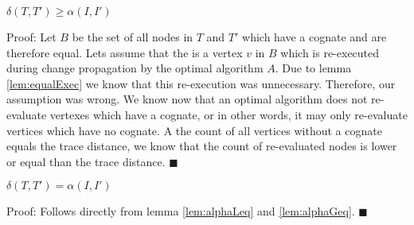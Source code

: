 \begin{lemma}
\label{lem:alphaGeq}
$\delta(T, T') \geq \alpha(I, I')$
\end{lemma} 
Proof: Let $B$ be the set of all nodes in $T$ and $T'$ which have a cognate and are therefore equal. Lets assume that the is a vertex $v$ in $B$ which is re-executed during change propagation by the optimal algorithm $A$. Due to lemma \ref{lem:equalExec} we know that this re-execution was unnecessary. Therefore, our assumption was wrong. We know now that an optimal algorithm does not re-evaluate vertexes which have a cognate, or in other words, it may only re-evaluate vertices which have no cognate. A the count of all vertices without a cognate equals the trace distance, we know that the count of re-evaluated nodes is lower or equal than the trace distance. $\blacksquare$

\begin{theorem}
$\delta(T, T') = \alpha(I, I')$
\end{theorem}
Proof: Follows directly from lemma \ref{lem:alphaLeq} and \ref{lem:alphaGeq}. $\blacksquare$
